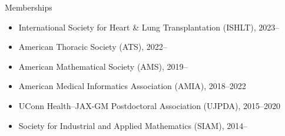 \documentclass[10pt,a4paper]{article}
\begin{document}
\vspace{.25cm}
{\sc Memberships}
\begin{itemize}[label=$\circ$,nolistsep]
\item
International Society for Heart \& Lung Transplantation (ISHLT), 2023--
\item
American Thoracic Society (ATS), 2022--
\item
American Mathematical Society (AMS), 2019--
\item
American Medical Informatics Association (AMIA), 2018--2022
\item
UConn Health--JAX-GM Postdoctoral Association (UJPDA), 2015--2020
\item
Society for Industrial and Applied Mathematics (SIAM), 2014--
\end{itemize}
\end{document}
